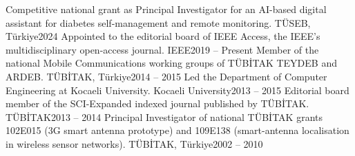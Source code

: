 
\begin{cvhonors}
    {Competitive national grant as Principal Investigator for an AI-based digital assistant for diabetes self-management and remote monitoring.}
    {TÜSEB, Türkiye}{2024}
    {Appointed to the editorial board of IEEE Access, the IEEE's multidisciplinary open-access journal.}
    {IEEE}{2019 -- Present}
    {Member of the national Mobile Communications working groups of TÜBİTAK TEYDEB and ARDEB.}
    {TÜBİTAK, Türkiye}{2014 -- 2015}
    {Led the Department of Computer Engineering at Kocaeli University.}
    {Kocaeli University}{2013 -- 2015}
    {Editorial board member of the SCI-Expanded indexed journal published by TÜBİTAK.}
    {TÜBİTAK}{2013 -- 2014}
    {Principal Investigator of national TÜBİTAK grants 102E015 (3G smart antenna prototype) and 109E138 (smart-antenna localisation in wireless sensor networks).}
    {TÜBİTAK, Türkiye}{2002 -- 2010}
\end{cvhonors}

